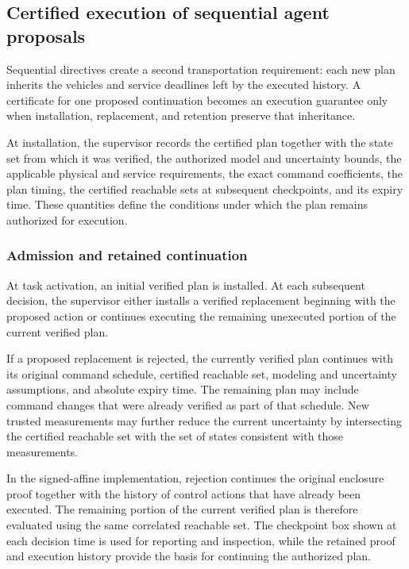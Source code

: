 \documentclass[journal,10pt]{IEEEtran}
\begin{document}
\subsection{Certified execution of sequential agent proposals}
\label{sec:new-execution}

Sequential directives create a second transportation requirement: each new
plan inherits the vehicles and service deadlines left by the executed history.
A certificate for one proposed continuation becomes an execution guarantee
only when installation, replacement, and retention preserve that inheritance.

At installation, the supervisor records the certified plan together with the
state set from which it was verified, the authorized model and uncertainty
bounds, the applicable physical and service requirements, the exact command coefficients, the plan timing, the certified reachable sets
at subsequent checkpoints, and its expiry time. These quantities define the conditions under which the plan remains
authorized for execution.

\subsubsection{Admission and retained continuation}

At task activation, an initial verified plan is installed. At each subsequent
decision, the supervisor either installs a verified replacement beginning with
the proposed action or continues executing the remaining unexecuted portion of
the current verified plan.

If a proposed replacement is rejected, the currently verified plan continues
with its original command schedule, certified reachable set, modeling and
uncertainty assumptions, and absolute expiry time. The remaining plan may
include command changes that were already verified as part of that schedule.
New trusted measurements may further reduce the current uncertainty by
intersecting the certified reachable set with the set of states consistent
with those measurements.

In the signed-affine implementation, rejection continues the original
enclosure proof together with the history of control actions that have already
been executed. The remaining portion of the current verified plan is therefore
evaluated using the same correlated reachable set. The checkpoint box shown
at each decision time is used for reporting and inspection, while the retained
proof and execution history provide the basis for continuing the authorized
plan.
\end{document}
